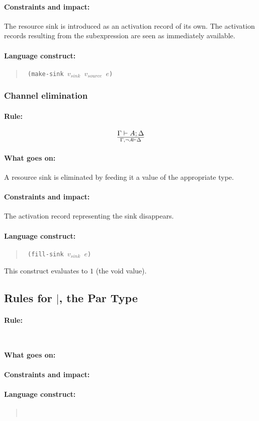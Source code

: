 \documentclass[a4paper]{article}
\begin{document}
\paragraph{Constraints and impact:} The resource sink is introduced as
an activation record of its own. The activation records resulting from
the subexpression are seen as immediately available.

\paragraph{Language construct:}
\begin{quote}\tt
  (make-sink $v_{sink}$ $v_{source}$ $e$)
\end{quote}

\subsubsection{Channel elimination}
\paragraph{Rule:}
$$
{
  \Gamma \vdash A; \Delta
}\over{
  \Gamma, \lnot A \vdash \Delta
}
$$

\paragraph{What goes on:} A resource sink is eliminated by feeding it
a value of the appropriate type.

\paragraph{Constraints and impact:} The activation record representing
the sink disappears.

\paragraph{Language construct:}
\begin{quote}\tt
  (fill-sink $v_{sink}$ $e$)
\end{quote}
This construct evaluates to $1$ (the void value).


\subsection{Rules for $|$, the Par Type}

\paragraph{Rule:}
$$
{
}\over{
}
$$
\paragraph{What goes on:}
\paragraph{Constraints and impact:}
\paragraph{Language construct:}
\begin{quote}\tt
\end{quote}



\end{document}
